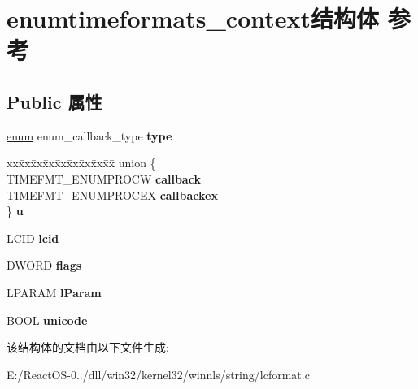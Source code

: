 \hypertarget{structenumtimeformats__context}{}\section{enumtimeformats\+\_\+context结构体 参考}
\label{structenumtimeformats__context}
\subsection*{Public 属性}
\begin{DoxyCompactItemize}
\item 
\mbox{\label{structenumtimeformats__context_ad6f6b1c1a2f58831deb807f4b344cba2}} 
\hyperlink{interfaceenum}{enum} enum\+\_\+callback\+\_\+type {\bfseries type}
\item 
\mbox{\label{structenumtimeformats__context_afcaa16ef982fba8cd1a0d2ea769422f0}} 
\begin{tabbing}
xx\=xx\=xx\=xx\=xx\=xx\=xx\=xx\=xx\=\kill
union \{\\
\>TIMEFMT\_ENUMPROCW {\bfseries callback}\\
\>TIMEFMT\_ENUMPROCEX {\bfseries callbackex}\\
\} {\bfseries u}\\

\end{tabbing}\item 
\mbox{\label{structenumtimeformats__context_ad3e09074f74f175c36db0489f973414b}} 
L\+C\+ID {\bfseries lcid}
\item 
\mbox{\label{structenumtimeformats__context_a43f2f22ad5dd05dc4fd0a38580d5dff6}} 
D\+W\+O\+RD {\bfseries flags}
\item 
\mbox{\label{structenumtimeformats__context_a85943ec797b13657e1dcd98f9f4a9275}} 
L\+P\+A\+R\+AM {\bfseries l\+Param}
\item 
\mbox{\label{structenumtimeformats__context_ad15cb51f6f098f54783114a24bfd8939}} 
B\+O\+OL {\bfseries unicode}
\end{DoxyCompactItemize}


该结构体的文档由以下文件生成\+:\begin{DoxyCompactItemize}
\item 
E\+:/\+React\+O\+S-\/0../dll/win32/kernel32/winnls/string/lcformat.\+c\end{DoxyCompactItemize}
